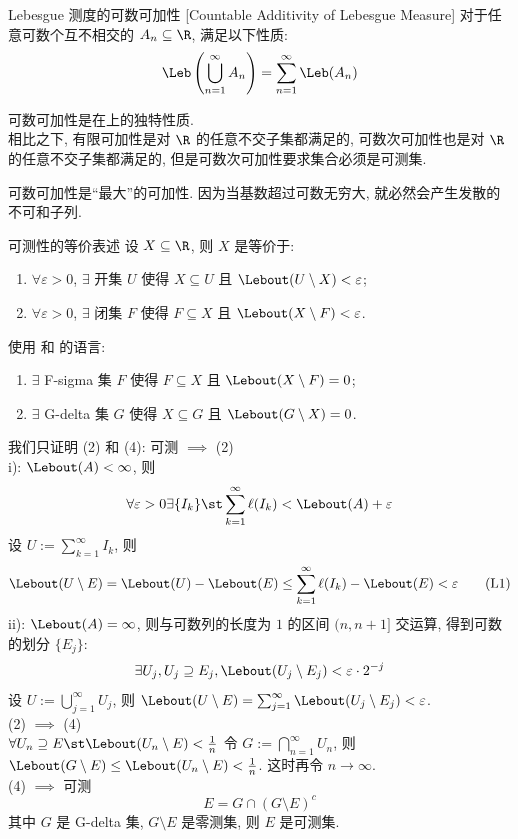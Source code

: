 \begin{ppt}
    {Lebesgue 测度的可数可加性}
    [Countable Additivity of Lebesgue Measure]
    对于任意可数个互不相交的\MeasurableSet{} \(A_n \subseteq \R\), 满足以下性质:
    \[\Leb\left(\bigcup_{n=1}^\infty A_n\right) = \sum_{n=1}^\infty \Leb(A_n)\]
\end{ppt}
\begin{rmk}
    [Dedicatia]
    可数可加性是在\MeasurableSet{}上的独特性质. \\
    相比之下, 有限可加性是对 \(\R\) 的任意不交子集都满足的, 可数次可加性也是对 \(\R\) 的任意不交子集都满足的, 但是可数次可加性要求集合必须是可测集. 
\end{rmk}
\begin{rmk}
    [Dedicatia]
    可数可加性是“最大”的可加性. 因为当基数超过可数无穷大, 就必然会产生发散的不可和子列.
\end{rmk}
\begin{thm}
    [measurability]
    {可测性的等价表述}
    设 \(X\subseteq\R\), 则 \(X\) 是\MeasurableSet{}等价于:
    \begin{enumerate}[label=(\arabic*)]
        \item \(\forall\varepsilon>0\), \(\exists\) 开集 \(U\) 使得 \(X\subseteq U\) 且 \(\Lebout(U\setminus X)<\varepsilon\);
        \item \(\forall\varepsilon>0\), \(\exists\) 闭集 \(F\) 使得 \(F\subseteq X\) 且 \(\Lebout(X\setminus F)<\varepsilon\).
    \end{enumerate}
    使用 \Fsigma{}和 \Gdelta{}的语言:
    \begin{enumerate}[label=(\arabic*), start=3]
        \item \(\exists\) F-sigma 集 \(F\) 使得 \(F\subseteq X\) 且 \(\Lebout(X\setminus F)=0\);
        \item \(\exists\) G-delta 集 \(G\) 使得 \(X\subseteq G\) 且 \(\Lebout(G\setminus X)=0\).
    \end{enumerate}
\end{thm}
\begin{prf}
    我们只证明 (2) 和 (4): 可测 $\implies$ (2) \\
    i): $\Lebout(A)<\infty$, 则 
    \[\forall\varepsilon>0\exists\{I_k\}\st \sum_{k=1}^{\infty} \ell(I_k) < \Lebout(A) + \varepsilon\]  
    设 \(U:=\sum\limits_{k=1}^{\infty}I_k\), 则 
    \[\Lebout(U\setminus E)=\Lebout(U)-\Lebout(E)\leq\sum_{k=1}^{\infty} \ell(I_k) - \Lebout(E)<\varepsilon\tag{L1}\]
    ii): $\Lebout(A)=\infty$, 则与可数列的长度为 \(1\) 的区间 \((n,n+1]\) 交运算, 得到可数的划分 \(\{E_j\}\):
    \[\exists U_j, U_j\supseteq E_j, \Lebout(U_j\setminus E_j)<\varepsilon\cdot 2^{-j}\]
    设 \(U:=\bigcup_{j=1}^\infty U_j\), 则 \(\Lebout(U\setminus E)=\sum_{j=1}^\infty \Lebout(U_j\setminus E_j)<\varepsilon\).\\
    (2) $\implies$ (4) \\
    \(\forall U_n\supseteq E \st \Lebout(U_n\setminus E)<\frac{1}{n}\) 令 \(G:=\bigcap_{n=1}^\infty U_n\), 则 \(\Lebout(G\setminus E)\leq\Lebout(U_n\setminus E)<\frac{1}{n}\). 这时再令 \(n\to\infty\).\\
    (4) $\implies$ 可测 
    \[E=G\cap(G\setminus E)^c\]
    其中 \(G\) 是 G-delta 集, \(G\setminus E\) 是零测集, 则 \(E\) 是可测集.
\end{prf}
